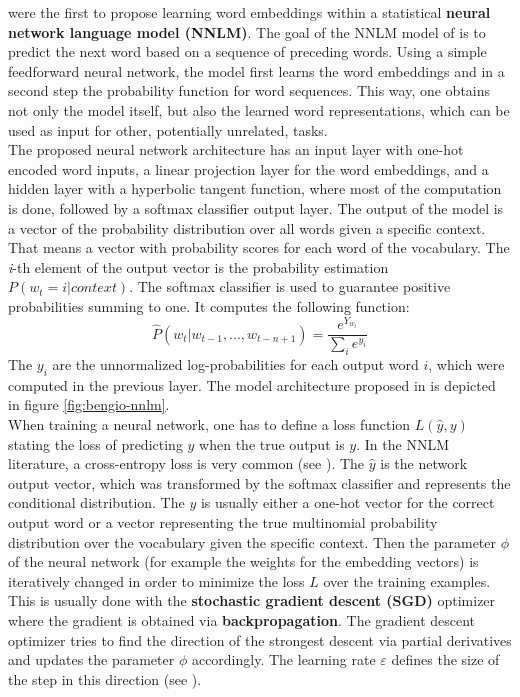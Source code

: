 \documentclass[]{krantz}
\begin{document}
\citet{Bengio.2003} were the first to propose learning word embeddings within a statistical \textbf{neural network language model (NNLM)}. The goal of the NNLM model of \citet{Bengio.2003} is to predict the next word based on a sequence of preceding words. Using a simple feedforward neural network, the model first learns the word embeddings and in a second step the probability function for word sequences. This way, one obtains not only the model itself, but also the learned word representations, which can be used as input for other, potentially unrelated, tasks.\\
The proposed neural network architecture has an input layer with one-hot encoded word inputs, a linear projection layer for the word embeddings, and a hidden layer with a hyperbolic tangent function, where most of the computation is done, followed by a softmax classifier output layer. The output of the model is a vector of the probability distribution over all words given a specific context. That means a vector with probability scores for each word of the vocabulary. The \emph{i}-th element of the output vector is the probability estimation \(P(w_t = i|context)\). The softmax classifier is used to guarantee positive probabilities summing to one. It computes the following function:
\[\widehat{P}(w_t|w_{t-1},...,w_{t-n+1}) = \frac{ e^{Y_{w_t}} }{ \sum_{i} {e^{y_i}} }\]
The \(y_i\) are the unnormalized log-probabilities for each output word \(i\), which were computed in the previous layer. The model architecture proposed in \citet{Bengio.2003} is depicted in figure \ref{fig:bengio-nnlm}.\\
When training a neural network, one has to define a loss function \(L(\widehat{y}, y)\) stating the loss of predicting \(\widehat{y}\) when the true output is \(y\). In the NNLM literature, a cross-entropy loss is very common (see \citet{goldberg2016primer}). The \(\widehat{y}\) is the network output vector, which was transformed by the softmax classifier and represents the conditional distribution. The \(y\) is usually either a one-hot vector for the correct output word or a vector representing the true multinomial probability distribution over the vocabulary given the specific context. Then the parameter \(\phi\) of the neural network (for example the weights for the embedding vectors) is iteratively changed in order to minimize the loss \(L\) over the training examples.\\
This is usually done with the \textbf{stochastic gradient descent (SGD)} optimizer where the gradient is obtained via \textbf{backpropagation}. The gradient descent optimizer tries to find the direction of the strongest descent via partial derivatives and updates the parameter \(\phi\) accordingly. The learning rate \(\varepsilon\) defines the size of the step in this direction (see \citet{goldberg2016primer}).\\
\end{document}
